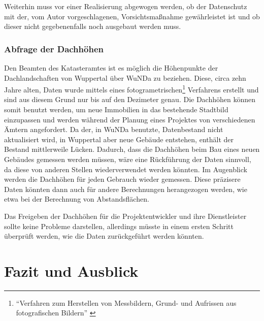 Weiterhin muss vor einer Realisierung abgewogen werden, ob der Datenschutz mit der, vom Autor vorgeschlagenen, Vorsichtsmaßnahme gewährleistet ist und ob dieser nicht gegebenenfalls noch ausgebaut werden muss.

\subsection{Abfrage der Dachhöhen}
\label{subsec:dachhoehen}
Den Beamten des Katasteramtes ist es möglich die Höhenpunkte der Dachlandschaften von Wuppertal über \ac{WuNDa} zu beziehen.
Diese, circa zehn Jahre alten, Daten wurde mittels eines fotogrametrischen\footnote{\enquote{Verfahren zum Herstellen von Messbildern, Grund- und Aufrissen aus fotografischen Bildern} \autocite{duden-foto}}
Verfahrens erstellt und sind aus diesem Grund nur bis auf den Dezimeter genau.
Die Dachhöhen können somit benutzt werden, um neue Immobilien in das bestehende Stadtbild einzupassen und werden während der Planung eines Projektes von verschiedenen Ämtern angefordert.
Da der, in \ac{WuNDa} benutzte, Datenbestand nicht aktualisiert wird, in Wuppertal aber neue Gebäude entstehen, enthält der Bestand mittlerweile Lücken.
Dadurch, dass die Dachhöhen beim Bau eines neuen Gebäudes gemessen werden müssen, wäre eine Rückführung der Daten sinnvoll, da diese von anderen Stellen wiederverwendet werden könnten.
Im Augenblick werden die Dachhöhen für jeden Gebrauch wieder gemessen.
Diese präzisere Daten könnten dann auch für andere Berechnungen herangezogen werden, wie etwa bei der Berechnung von Abstandsflächen.

Das Freigeben der Dachhöhen für die Projektentwickler und ihre Dienstleister sollte keine Probleme darstellen, allerdings müsste in einem ersten Schritt überprüft werden, wie die Daten zurückgeführt werden könnten.

\chapter{Fazit und Ausblick}
